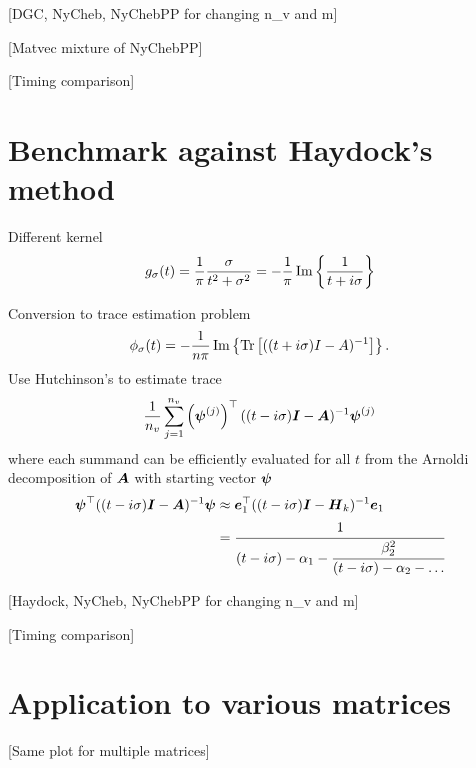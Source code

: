 [DGC, NyCheb, NyChebPP for changing n\_v and m]

[Matvec mixture of NyChebPP]

[Timing comparison]

\section{Benchmark against Haydock's method}
\label{sec:5-experiments-haydock-method}

Different kernel
\begin{equation}
    g_{\sigma}(t) = \frac{1}{\pi} \frac{\sigma}{t^2 + \sigma^2} = -\frac{1}{\pi} \operatorname{Im}\left\{ \frac{1}{t + i\sigma} \right\}
    \label{equ:5-experiments-cauchy-kernel}
\end{equation}

Conversion to trace estimation problem
\begin{equation}
    \phi_{\sigma}(t) = - \frac{1}{n \pi} \operatorname{Im} \left\{ \operatorname{Tr}\left[((t + i\sigma)I - A)^{-1}\right]  \right\}.
    \label{equ:5-experiments-haydock-trace}
\end{equation}
Use Hutchinson's to estimate trace
\begin{equation}
    \frac{1}{n_v} \sum_{j=1}^{n_v} \left( \boldsymbol{\psi}^{(j)} \right)^{\top} ((t - i\sigma)\boldsymbol{I} - \boldsymbol{A})^{-1} \boldsymbol{\psi}^{(j)}
    \label{equ:5-experiments-haydock-hutchinson}
\end{equation}
where each summand can be efficiently evaluated for all $t$ from the Arnoldi decomposition of $\boldsymbol{A}$ with starting vector $\boldsymbol{\psi}$
\begin{align}
    \boldsymbol{\psi}^{\top} ((t - i\sigma)\boldsymbol{I} - \boldsymbol{A})^{-1} \boldsymbol{\psi} &\approx \boldsymbol{e}_1^{\top} ((t - i\sigma)\boldsymbol{I} - \boldsymbol{H}_k)^{-1} \boldsymbol{e}_1 \notag \\
    &= \cfrac{1}{(t - i\sigma) - \alpha_1 - \cfrac{\beta_2^2}{(t - i\sigma) - \alpha_2 - \dots}}
    \label{equ:5-experiments-haydock-recursion}
\end{align}

[Haydock, NyCheb, NyChebPP for changing n\_v and m]

[Timing comparison]

\section{Application to various matrices}
\label{sec:5-experiments-various-matrices}

[Same plot for multiple matrices]
